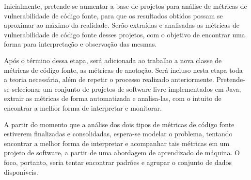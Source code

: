 Inicialmente, pretende-se aumentar a base de projetos para análise de métricas
de vulnerabilidade de código fonte, para que os resultados obtidos possam
se aproximar ao máximo da realidade. Serão extraídas e analisadas as métricas de
vulnerabilidade de código fonte desses projetos, com o objetivo de encontrar uma
forma para interpretação e observação das mesmas.

Após o término dessa etapa, será adicionada ao trabalho a nova classe de
métricas de código fonte, as métricas de anotação. Será incluso nesta
etapa toda a teoria necessária, além de repetir o processo realizado
anteriormente. Pretende-se selecionar um conjunto de projetos de software livre
implementados em Java, extrair as métricas de forma automatizada e analisa-las,
com o intuito de encontrar a melhor forma de interpretar e monitorar.

A partir do momento que a análise dos dois tipos de métricas de código fonte
estiverem finalizadas e consolidadas, espera-se modelar o problema, tentando
encontrar a melhor forma de  
interpretar e acompanhar tais métricas em um projeto de
software, a partir de uma abordagem de aprendizado de máquina. O foco, portanto,
seria tentar encontrar padrões e agrupar o conjunto de dados disponíveis.

